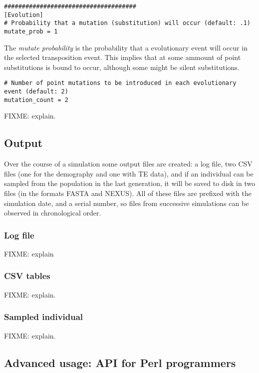 \documentclass[10pt]{article}
\begin{document}
\begin{verbatim}
#####################################
[Evolution]
# Probability that a mutation (substitution) will occur (default: .1)
mutate_prob = 1
\end{verbatim}

The {\em mutate probability} is the probability that a evolutionary
event will occur in the selected transposition event. This implies
that at some ammount of point substitutions is bound to occur,
although some might be silent substitutions.

\begin{verbatim}
# Number of point mutations to be introduced in each evolutionary event (default: 2)
mutation_count = 2
\end{verbatim}

FIXME: explain.

\subsection{Output}
\label{sec:output}

Over the course of a simulation some output files are created: a log
file, two CSV files (one for the demography and one with TE data), and
if an individual can be sampled from the population in the last
generation, it will be saved to disk in two files (in the formats
FASTA and NEXUS). All of these files are prefixed with the simulation
date, and a serial number, so files from successive simulations can be
observed in chronological order.

\subsubsection{Log file}
\label{sec:output_log}


FIXME: explain

\subsubsection{CSV tables}
\label{sec:output_csv}

FIXME: explain.

\subsubsection{Sampled individual}
\label{sec:output_sample}

FIXME: explain.

\subsection{Advanced usage: API for Perl programmers}
\end{document}

